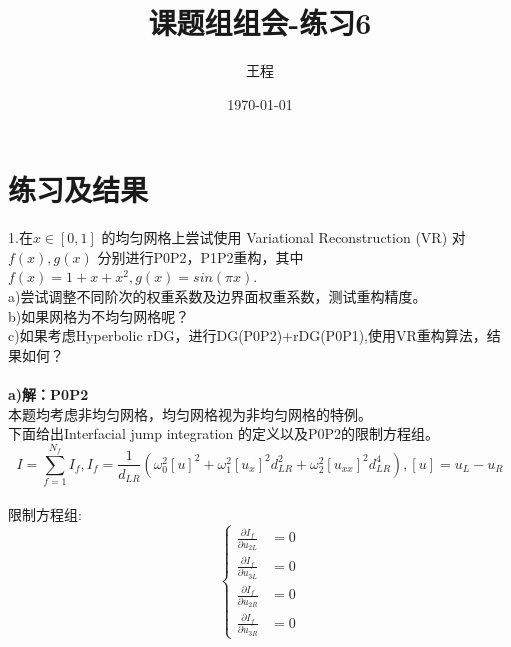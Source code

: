 \documentclass[a4paper,11pt,UTF8]{article}%
\theoremstyle{plain}
\begin{document}
	\title{\heiti 课题组组会-练习6}
	\author{王程 }
	\date{\today}
	\maketitle
	
	\section{练习及结果}
	1.在$x\in \left[0,1\right]$ 的均匀网格上尝试使用 Variational Reconstruction (VR) 对$f\left(x\right),g\left(x\right)$ 分别进行P0P2，P1P2重构，其中$f\left(x\right)=1+x+x^2,g\left(x\right)=sin\left(\pi x\right)$.\\
	\indent a)尝试调整不同阶次的权重系数及边界面权重系数，测试重构精度。\\
	\indent b)如果网格为不均匀网格呢？\\
	\indent c)如果考虑Hyperbolic rDG，进行DG(P0P2)+rDG(P0P1),使用VR重构算法，结果如何？\\
	~\\
	\noindent \textbf{a)解：P0P2}\\
\indent 本题均考虑非均匀网格，均匀网格视为非均匀网格的特例。\\
\indent 下面给出Interfacial jump integration 的定义以及P0P2的限制方程组。\\
$$I=\sum_{f=1}^{N_f}I_f, I_f=\frac{1}{d_{LR}}\left(\omega^2_0\left[u\right]^2+\omega^2_1\left[u_x\right]^2d^2_{LR}+\omega_2^2\left[u_{xx}\right]^2d^4_{LR}\right), \left[u\right]=u_L-u_R$$\\
限制方程组:
\\$$\left\{
\begin{aligned}
	\frac{\partial I_f}{\partial u_{2L}}&=0\\
    \frac{\partial I_f}{\partial u_{3L}}&=0\\
    \frac{\partial I_f}{\partial u_{2R}}&=0\\
    \frac{\partial I_f}{\partial u_{3R}}&=0
\end{aligned}
\right.$$
\end{document}
